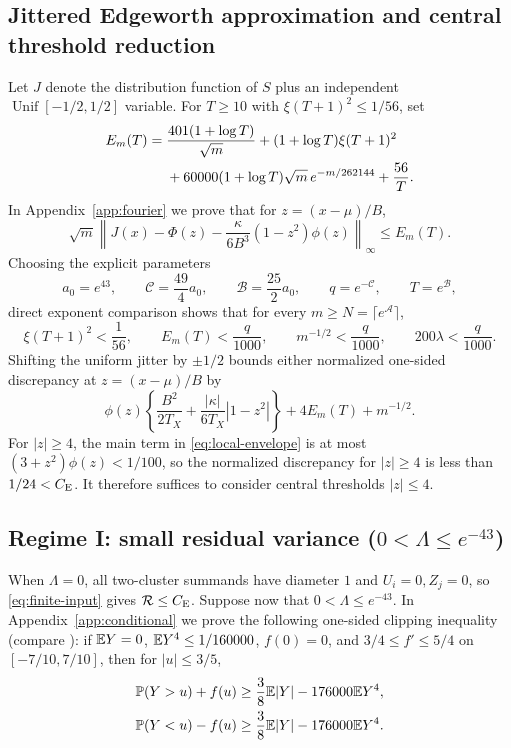 \subsection{Jittered Edgeworth approximation and central threshold reduction}

Let $J$ denote the distribution function of $S$ plus an independent
$\operatorname{Unif}[-1/2,1/2]$ variable. For $T\ge10$ with $\xi(T+1)^2\le1/56$,
set
\begin{align}
 E_m(T)={}&\frac{401(1+\log T)}{\sqrt m}
       +(1+\log T)\xi(T+1)^2\notag\\
       &+60000(1+\log T)\sqrt m\,e^{-m/262144}+\frac{56}{T}.       \label{eq:local-error}
\end{align}
In Appendix~\ref{app:fourier} we prove that for $z=(x-\mu)/B$,
\begin{equation}\label{eq:local-jitter}
 \sqrt m\left\|J(x)-\Phi(z)
             -\frac\kappa{6B^3}(1-z^2)\phi(z)\right\|_\infty\le E_m(T).
\end{equation}
Choosing the explicit parameters
\[
 a_0=e^{43},\qquad\mathcal C=\frac{49}{4}a_0,\qquad
 \mathcal B=\frac{25}{2}a_0,
 \qquad q=e^{-\mathcal C},\qquad T=e^{\mathcal B},
\]
direct exponent comparison shows that for every $m\ge N=\lceil e^{\mathcal A}\rceil$,
\begin{equation}\label{eq:local-numerical}
 \xi(T+1)^2<\frac1{56},\qquad E_m(T)<\frac q{1000},\qquad
 m^{-1/2}<\frac q{1000},\qquad200\lambda<\frac q{1000}.
\end{equation}
Shifting the uniform jitter by $\pm1/2$ bounds either normalized one-sided
discrepancy at $z=(x-\mu)/B$ by
\begin{equation}\label{eq:local-envelope}
 \phi(z)\left\{\frac{B^2}{2T_X}
      +\frac{|\kappa|}{6T_X}|1-z^2|\right\}+4E_m(T)+m^{-1/2}.
\end{equation}
For $|z|\ge4$, the main term in \eqref{eq:local-envelope} is at most
$(3+z^2)\phi(z)<1/100$, so the normalized discrepancy for $|z|\ge4$ is less
than $1/24<C_{\mathrm E}$. It therefore suffices to consider central thresholds
$|z|\le4$.

\subsection{Regime I: small residual variance ($0<\Lambda\le e^{-43}$)}\label{subsec:small-residual}

When $\Lambda=0$, all two-cluster summands have diameter $1$ and $U_i=0,Z_j=0$,
so \eqref{eq:finite-input} gives $\mathcal R\le C_{\mathrm E}$. Suppose now that
$0<\Lambda\le e^{-43}$. In Appendix~\ref{app:conditional} we prove the
following one-sided clipping inequality (compare \citet[Lemma~3.2]{HeCheng2026}):
if $\mathbb E Y=0$, $\mathbb E Y^4\le1/160000$, $f(0)=0$, and $3/4\le f'\le5/4$ on
$[-7/10,7/10]$, then for $|u|\le3/5$,
\begin{align}
 \mathbb P(Y>u)+f(u)&\ge\frac38\mathbb E|Y|-176000\mathbb E Y^4,\notag\\
 \mathbb P(Y<u)-f(u)&\ge\frac38\mathbb E|Y|-176000\mathbb E Y^4.             \label{eq:one-sided}
\end{align}

